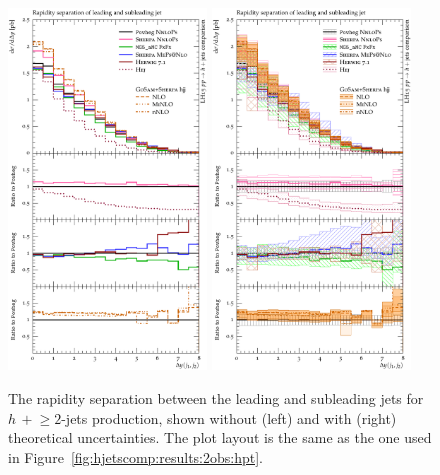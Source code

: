 \begin{figure}[t!]
  \centering
  \includegraphics[width=0.47\textwidth]{figures/hjetscomp_u_deltay_jj.pdf}
  \hfill
  \includegraphics[width=0.47\textwidth]{figures/hjetscomp_deltay_jj.pdf}
  \caption{\label{fig:hjetscomp:results:2obs:dyjj}%
    The rapidity separation between the leading and subleading jets
    for $h\,+\!\ge\!\!2$-jets production, shown without (left) and with
    (right) theoretical uncertainties. The plot layout is the same as
    the one used in Figure~\ref{fig:hjetscomp:results:2obs:hpt}.}
\end{figure}

